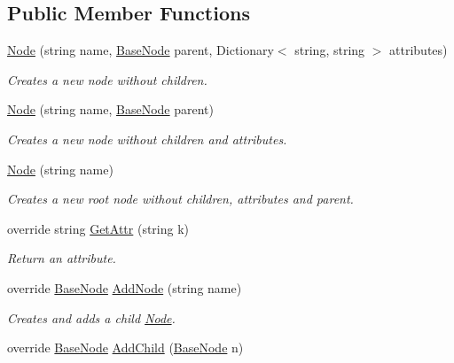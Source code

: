 \subsection*{Public Member Functions}
\begin{DoxyCompactItemize}
\item 
\hyperlink{class_x_m_leru_handleru_1_1_node_af3e096333b8dcc74789ebc04c0984856}{Node} (string name, \hyperlink{class_x_m_leru_handleru_1_1_base_node}{Base\+Node} parent, Dictionary$<$ string, string $>$ attributes)
\begin{DoxyCompactList}\small\item\em Creates a new node without children. \end{DoxyCompactList}\item 
\hyperlink{class_x_m_leru_handleru_1_1_node_a8060ae6840e807ebf3d3ef7f27a468bf}{Node} (string name, \hyperlink{class_x_m_leru_handleru_1_1_base_node}{Base\+Node} parent)
\begin{DoxyCompactList}\small\item\em Creates a new node without children and attributes. \end{DoxyCompactList}\item 
\hyperlink{class_x_m_leru_handleru_1_1_node_ad8005a9ca54062189361e811e7064cff}{Node} (string name)
\begin{DoxyCompactList}\small\item\em Creates a new root node without children, attributes and parent. \end{DoxyCompactList}\item 
override string \hyperlink{class_x_m_leru_handleru_1_1_node_a48a1af10d6641de6b360dd5b2e3e3729}{Get\+Attr} (string k)
\begin{DoxyCompactList}\small\item\em Return an attribute. \end{DoxyCompactList}\item 
override \hyperlink{class_x_m_leru_handleru_1_1_base_node}{Base\+Node} \hyperlink{class_x_m_leru_handleru_1_1_node_aa79ab2740c301fca30270de273d1c796}{Add\+Node} (string name)
\begin{DoxyCompactList}\small\item\em Creates and adds a child \hyperlink{class_x_m_leru_handleru_1_1_node}{Node}. \end{DoxyCompactList}\item 
override \hyperlink{class_x_m_leru_handleru_1_1_base_node}{Base\+Node} \hyperlink{class_x_m_leru_handleru_1_1_node_ad6070ed490bfde070bdb07461fd873e1}{Add\+Child} (\hyperlink{class_x_m_leru_handleru_1_1_base_node}{Base\+Node} n)

\end{DoxyCompactItemize}
